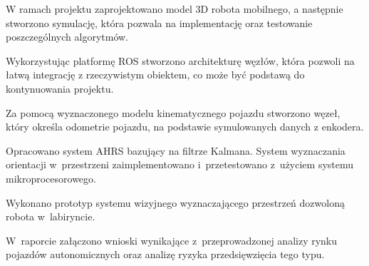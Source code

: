 W ramach projektu zaprojektowano model 3D robota mobilnego, a następnie
stworzono symulację, która pozwala na implementację oraz testowanie
poszczególnych algorytmów.

Wykorzystując platformę ROS stworzono architekturę węzłów, która pozwoli na
łatwą integrację z rzeczywistym obiektem, co może być podstawą do kontynuowania
projektu.

Za pomocą wyznaczonego modelu kinematycznego pojazdu stworzono węzeł, który
określa odometrie pojazdu, na podstawie symulowanych danych z enkodera.

Opracowano system AHRS bazujący na filtrze Kalmana.
System wyznaczania orientacji w~przestrzeni zaimplementowano i~przetestowano
z~użyciem systemu mikroprocesorowego.

Wykonano prototyp systemu wizyjnego wyznaczającego przestrzeń dozwoloną robota
w~labiryncie.

W~raporcie załączono wnioski wynikające z~przeprowadzonej analizy rynku
pojazdów autonomicznych oraz analizę ryzyka przedsięwzięcia tego typu.
